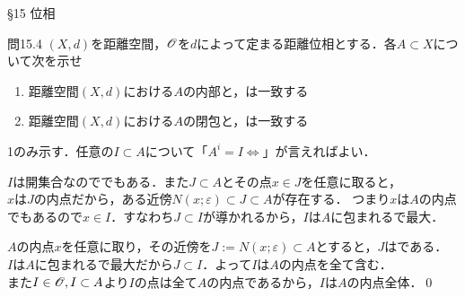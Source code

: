 \documentclass[uplatex,a4paper,dvipdfmx,aspectratio=169,11pt]{beamer}
\begin{document}
\begin{frame}[fragile]{\S 15 位相}
    \begin{exampleblock}{問15.4}
        $(X, d)$を距離空間，$\mathscr{O}$を$d$によって定まる距離位相とする．各$A \subset X$について次を示せ
        \begin{enumerate}
            \item \alert{距離空間$(X, d)$における$A$の内部}と，は一致する
            \item \alert{距離空間$(X, d)$における$A$の閉包}と，は一致する
        \end{enumerate}
    \end{exampleblock}

    \medskip{}

     \quad 1のみ示す．任意の$I \subset A$について「\alert{$A^i = I$}$\iff$」が言えればよい．
   \begin{description}[$\Rightarrow$]
       \item[$(\Rightarrow)$] $I$は\alert{開集合}なのででもある．また$J \subset A$とその点$x \in J$を任意に取ると，\\
           $x$は$J$の\alert{内点}だから，ある近傍$N(x; \varepsilon) \subset J \subset A$が存在する．
           つまり$x$は$A$の\alert{内点}でもあるので$x \in I$．すなわち$J \subset I$が導かれるから，$I$は$A$に包まれるで最大．
       \item[$(\Leftarrow)$] $A$の\alert{内点}$x$を任意に取り，その\alert{近傍}を$J := N(x; \varepsilon) \subset A$とすると，$J$はである．\\
           $I$は$A$に包まれるで最大だから$J \subset I$．よって$I$は$A$の\alert{内点}を全て含む．\\
           また$I \in \mathscr{O},I \subset A$より$I$の点は全て$A$の\alert{内点}であるから，$I$は$A$の\alert{内点}全体．\qed
   \end{description} 

\end{frame}
\end{document}
